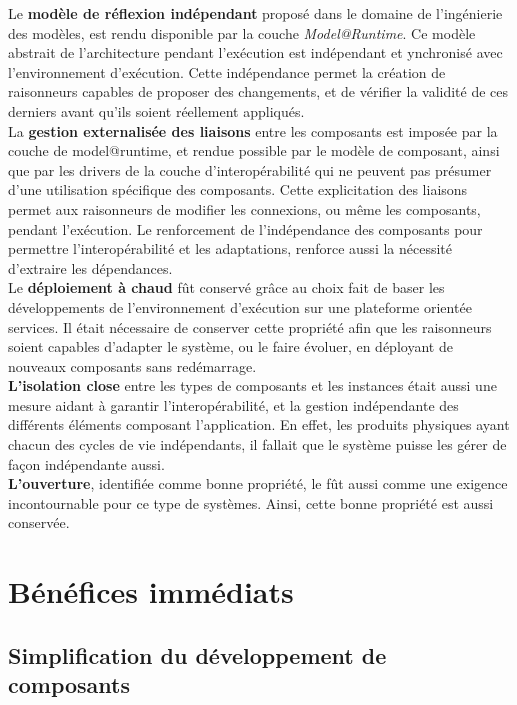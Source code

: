 Le {\bf modèle de réflexion indépendant} proposé dans le domaine de l'ingénierie des modèles, est rendu disponible par la couche {\it Model@Runtime}. Ce modèle abstrait de l'architecture pendant l'exécution est indépendant et ynchronisé avec l'environnement d'exécution. Cette indépendance permet la création de raisonneurs capables de proposer des changements, et de vérifier la validité de ces derniers avant qu'ils soient réellement appliqués.\\
La {\bf gestion externalisée des liaisons} entre les composants est imposée par la couche de model@runtime, et rendue possible par le modèle de composant, ainsi que par les drivers de la couche d'interopérabilité qui ne peuvent pas présumer d'une utilisation spécifique des composants. Cette explicitation des liaisons permet aux raisonneurs de modifier les connexions, ou même les composants, pendant l'exécution. Le renforcement de l'indépendance des composants pour permettre l'interopérabilité et les adaptations, renforce aussi la nécessité d'extraire les dépendances.\\
Le {\bf déploiement à chaud} fût conservé grâce au choix fait de baser les développements de l'environnement d'exécution sur une plateforme orientée services. Il était nécessaire de conserver cette propriété afin que les raisonneurs soient capables d'adapter le système, ou le faire évoluer, en déployant de nouveaux composants sans redémarrage.\\
{\bf L'isolation close} entre les types de composants et les instances était aussi une mesure aidant à garantir l'interopérabilité, et la gestion indépendante des différents éléments composant l'application. En effet, les produits physiques ayant chacun des cycles de vie indépendants, il fallait que le système puisse les gérer de façon indépendante aussi.\\
{\bf L'ouverture}, identifiée comme bonne propriété, le fût aussi comme une exigence incontournable pour ce type de systèmes. Ainsi, cette bonne propriété est aussi conservée.

\section{Bénéfices immédiats}

\subsection{Simplification du développement de composants}

